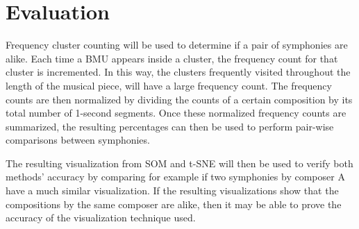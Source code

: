 \section{Evaluation}
Frequency cluster counting will be used to determine if a pair of symphonies are alike. Each time a BMU appears inside a cluster, the frequency count for that cluster is incremented. In this way, the clusters frequently visited throughout the length of the musical piece, will have a large frequency count. The frequency counts are then normalized by dividing the counts of a certain composition by its total number of 1-second segments. Once these normalized frequency counts are summarized, the resulting percentages can then be used to perform pair-wise comparisons between symphonies.

The resulting visualization from SOM and t-SNE will then be used to verify both methods’ accuracy by comparing for example if two symphonies by composer A have a much similar visualization. If the resulting visualizations show that the compositions by the same composer are alike, then it may be able to prove the accuracy of the visualization technique used.